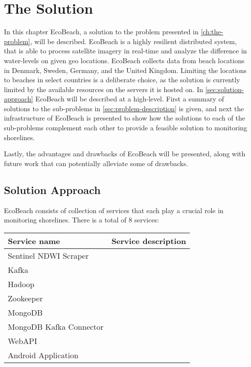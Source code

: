 \chapter{The Solution}

In this chapter EcoBeach, a solution to the problem presented in \autoref{ch:the-problem}, will be described. EcoBeach is a highly resilient distributed system, that is able to process satellite imagery in real-time and analyze the difference in water-levels on given geo locations.
EcoBeach collects data from beach locations in Denmark, Sweden, Germany, and the United Kingdom. Limiting the locations to beaches in select countries is a deliberate choice, as the solution is currently limited by the available resources on the servers it is hosted on.\medbreak
\noindent
In \autoref{sec:solution-approach}  EcoBeach will be described at a high-level. First a summary of solutions to the sub-problems in \autoref{sec:problem-description} is given, and next the infrastructure of EcoBeach is presented to show how the solutions to each of the sub-problems complement each other to provide a feasible solution to monitoring shorelines.

Lastly, the advantages and drawbacks of EcoBeach will be presented, along with future work that can potentially alleviate some of drawbacks.

\section{Solution Approach}\label{sec:solution-approach}

EcoBeach consists of collection of services that each play a crucial role in monitoring shorelines. There is a total of 8 services: 

\begin{table}[]
    \begin{tabular}{|l|l|}
        \hline
        \textbf{Service name}   & \textbf{Service description} \\ \hline
        Sentinel NDWI Scraper   &                              \\\hline
        Kafka                   &                              \\\hline
        Hadoop                  &                              \\\hline
        Zookeeper               &                              \\\hline
        MongoDB                 &                              \\\hline
        MongoDB Kafka Connector &                              \\\hline
        WebAPI                  &                              \\\hline
        Android Application     &                              \\\hline
    \end{tabular}
\end{table}

